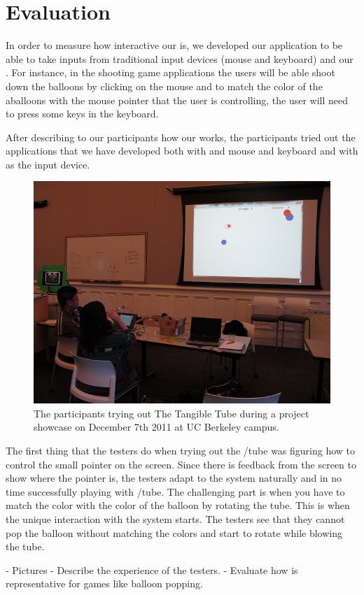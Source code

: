 \section{Evaluation}\label{sec:eval}
In order to measure how interactive our \tube is, we developed our application to be able to take inputs from traditional input devices (\ie mouse and keyboard) and our \tube. For instance, in the shooting game applications the users will be able shoot down the balloons by clicking on the mouse and to match the color of the aballoons with the mouse pointer that the user is controlling, the user will need to press some keys in the keyboard.

After describing to our participants how our \tube works, the participants tried out the applications that we have developed both with and mouse and keyboard and with \tube as the input device.

\begin{figure}
  \centering
  \includegraphics[width=\linewidth]{./figs/impl2.png}
  \caption{The participants trying out The Tangible Tube during a project showcase on December 7th 2011 at UC Berkeley campus.}
  \label{fig:impl2}
\end{figure}

The first thing that the testers do when trying out the /tube was figuring how to control the small pointer on the screen. Since there is feedback from the screen to show where the pointer is, the testers adapt to the system naturally and in no time successfully playing with /tube. The challenging part is when you have to match the color with the color of the balloon by rotating the tube. This is when the unique interaction with the system starts. The testers see that they cannot pop the balloon without matching the colors and start to rotate while blowing the tube. 


\TODO
- Pictures \newline
- Describe the experience of the testers. \newline
- Evaluate how \tube is representative for games like balloon popping.
